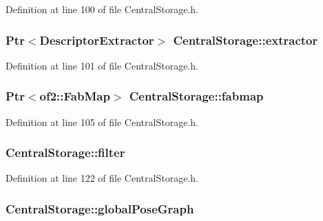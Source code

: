 \-Definition at line 100 of file \-Central\-Storage.\-h.

\hypertarget{classCentralStorage_a8c18048b9cf9171a16d6d9e2fa8f8754}{
\subsubsection[{extractor}]{\setlength{\rightskip}{0pt plus 5cm}\-Ptr$<$\-Descriptor\-Extractor$>$ {\bf \-Central\-Storage\-::extractor}}}\label{classCentralStorage_a8c18048b9cf9171a16d6d9e2fa8f8754}


\-Definition at line 101 of file \-Central\-Storage.\-h.

\hypertarget{classCentralStorage_a4172d4d2a8509cb0bfbdb4edc8a3707b}{
\subsubsection[{fabmap}]{\setlength{\rightskip}{0pt plus 5cm}\-Ptr$<$of2\-::\-Fab\-Map$>$ {\bf \-Central\-Storage\-::fabmap}}}\label{classCentralStorage_a4172d4d2a8509cb0bfbdb4edc8a3707b}


\-Definition at line 105 of file \-Central\-Storage.\-h.

\hypertarget{classCentralStorage_af952071a5b552f94e01d8667227bfa57}{
\subsubsection[{filter}]{ {\bf \-Central\-Storage\-::filter}}}\label{classCentralStorage_af952071a5b552f94e01d8667227bfa57}


\-Definition at line 122 of file \-Central\-Storage.\-h.

\hypertarget{classCentralStorage_a710a94a5fbcb985594717f0864405872}{
\subsubsection[{global\-Pose\-Graph}]{ {\bf \-Central\-Storage\-::global\-Pose\-Graph}}}\label{classCentralStorage_a710a94a5fbcb985594717f0864405872}


